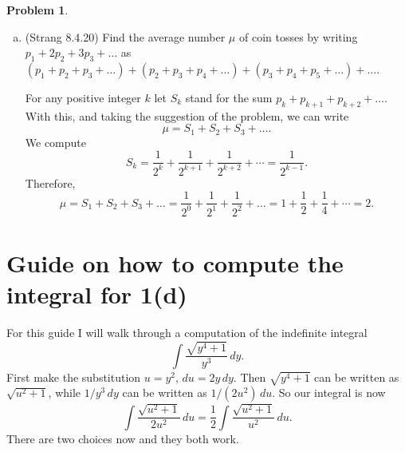 \documentclass[11pt,oneside]{amsart}
\theoremstyle{definition}
\newtheorem{problem}{Problem}
\begin{document}
\begin{problem}
\begin{enumerate}[(a)]
\begin{solution}
                For those unfamiliar with geometric series, brushing up on geometric series is a good idea! Also, this problem illustrates a very common and useful theme in proving lower and upper bounds for quantities that are hard to compute: we find some intermediate quantity that is easier to compute, then prove that $P$ is at most (resp.\ at least) that quantity, and that that quantity is at most (resp.\ at least) the target upper (resp.\ lower) bound. Or, in fewer words, the strategy for proving that $P\leq Q$ is to find some number $R$ for which you can easily prove $P\leq R$ and $R\leq Q$.
            \end{solution}
            \item (Strang 8.4.20) Find the average number $\mu$ of coin tosses by writing $p_1+2p_2+3p_3+\dots$ as $(p_1+p_2+p_3+\dots)+(p_2+p_3+p_4+\dots)+(p_3+p_4+p_5+\dots)+\dots$.
            \begin{solution}
                For any positive integer $k$ let $S_k$ stand for the sum $p_k+p_{k+1}+p_{k+2}+\dots$. With this, and taking the suggestion of the problem, we can write
                \[\mu=S_1+S_2+S_3+\dots.\]
                We compute
                \[S_k=\frac 1{2^k}+\frac1{2^{k+1}}+\frac 1{2^{k+2}}+\cdots=\frac 1{2^{k-1}}.\]
                Therefore,
                \[\mu=S_1+S_2+S_3+\dots=\frac 1{2^0}+\frac 1{2^1}+\frac 1{2^2}+\dots=1+\frac 12+\frac 14+\cdots=2.\]
            \end{solution}
        \end{enumerate}
    \end{problem}


    \newpage

    \section*{Guide on how to compute the integral for 1(d)}

    For this guide I will walk through a computation of the indefinite integral
    \[\int\frac {\sqrt{y^4+1}}{y^3}\,dy.\]
    First make the substitution $u=y^2$, $du=2y\,dy$. Then $\sqrt{y^4+1}$ can be written as $\sqrt{u^2+1}$, while $1/y^3\,dy$ can be written as $1/(2u^2)\,du$. So our integral is now
    \[\int\frac{\sqrt{u^2+1}}{2u^2}\,du=\frac12\int\frac{\sqrt{u^2+1}}{u^2}\,du.\]
    There are two choices now and they both work.
\end{document}
